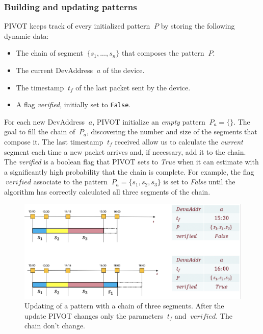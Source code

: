 \subsubsection{Building and updating patterns}
\label{updating}
PIVOT keeps track of every initialized pattern \(\ P \) by storing the following dynamic data:
\begin{itemize}
	\item The chain of segment \(\ \{ s_{1}, ..., s_{n} \} \) that composes the pattern \(\ P \).
	\item The current DevAddress \(\ a \) of the device.
	\item The timestamp \(\ t_{f} \) of the last packet sent by the device.
	\item A flag \textit{verified}, initially set to \texttt{False}.
\end{itemize}
For each new DevAddress \(\ a \), PIVOT initialize an \textit{empty} pattern \(\ P_{a} = \{\}\). The goal to fill the chain of \(\ P_{a} \), discovering the number and size of the segments that compose it. The last timestamp \(\ t_{f} \) received allow us to calculate the \textit{current} segment each time a new packet arrives and, if necessary, add it to the chain. 
\\
The \textit{verified} is a boolean flag that PIVOT sets to \textit{True} when it can estimate with a significantly high probability that the chain is complete. For example, the flag \(\ verified \) associate to the pattern \(\ P_{a} = \{ s_{1}, s_{2}, s_{3} \} \) is set to \textit{False} until the algorithm has correctly calculated all three segments of the chain.

\vspace{3mm}
\begin{figure}[H]
    \centering
    \includegraphics[width=0.7\linewidth]{images/pivot/updating.png}
    \caption{Updating of a pattern with a chain of three segments. After the update PIVOT changes only the parameters \(\ t_{f}\) and \(\ verified \). The chain don't change.}
    \label{fig:updating}
\end{figure}
\vspace{3mm}

